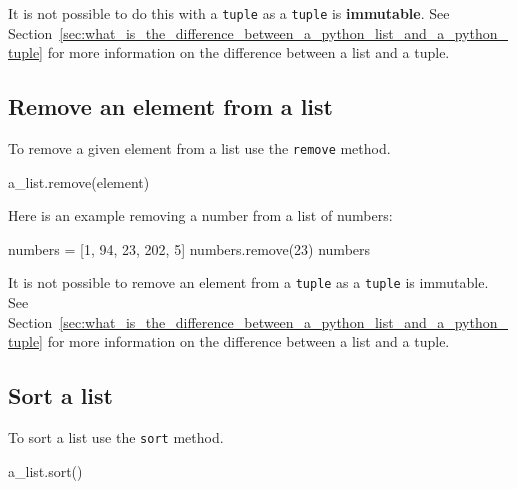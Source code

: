 \begin{note}
It is not possible to do this with a \texttt{tuple} as a \texttt{tuple} is
\textbf{immutable}. See
Section~\ref{sec:what_is_the_difference_between_a_python_list_and_a_python_tuple}
for more information on the difference between a list and a tuple.
\end{note}



\subsection{Remove an element from a list}

To remove a given element from a list use the \texttt{remove} method.


\begin{pyin}
a_list.remove(element)
\end{pyin}



Here is an example removing a number from a list of numbers:




\begin{pyin}
numbers = [1, 94, 23, 202, 5]
numbers.remove(23)
numbers
\end{pyin}





\begin{raw}
[1, 94, 202, 5]
\end{raw}





\begin{note}
It is not possible to remove an element from a \texttt{tuple} as a
\texttt{tuple} is
immutable. See
Section~\ref{sec:what_is_the_difference_between_a_python_list_and_a_python_tuple}
for more information on the difference between a list and a tuple.

\end{note}



\subsection{Sort a list}
\label{\detokenize{building-tools/02-functions-and-data-structures/how/main:sort-a-list}}

To sort a list use the \texttt{sort} method.


\begin{pyin}
a_list.sort()
\end{pyin}



